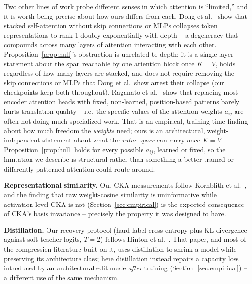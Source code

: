 \documentclass[11pt]{article}
\begin{document}
Two other lines of work probe different senses in which attention is ``limited,'' and
it is worth being precise about how ours differs from each. Dong et
al.~\cite{dong2021attention} show that stacked self-attention without skip connections
or MLPs collapses token representations to rank 1 doubly exponentially with depth -- a
degeneracy that compounds across many layers of attention interacting with each other.
Proposition~\ref{prop:hull}'s obstruction is unrelated to depth: it is a single-layer
statement about the span reachable by one attention block once $K=V$, holds regardless
of how many layers are stacked, and does not require removing the skip connections or
MLPs that Dong et al.\ show arrest their collapse (our checkpoints keep both
throughout). Raganato et al.~\cite{raganato2020fixed} show that replacing most encoder
attention heads with fixed, non-learned, position-based patterns barely hurts
translation quality -- i.e.\ the specific values of the attention weights $a_{ij}$ are
often not doing much specialized work. That is an empirical, training-time finding
about how much freedom the \emph{weights} need; ours is an architectural,
weight-independent statement about what the \emph{value space} can carry once $K=V$ --
Proposition~\ref{prop:hull} holds for every possible $a_{ij}$, learned or fixed, so the
limitation we describe is structural rather than something a better-trained or
differently-patterned attention could route around.

\textbf{Representational similarity.} Our CKA measurements follow Kornblith et
al.~\cite{kornblith2019similarity}, and the finding that raw weight-cosine similarity
is uninformative while activation-level CKA is not (Section~\ref{sec:empirical}) is
the expected consequence of CKA's basis invariance -- precisely the property it was
designed to have.

\textbf{Distillation.} Our recovery protocol (hard-label cross-entropy plus KL
divergence against soft teacher logits, $T=2$) follows Hinton et
al.~\cite{hinton2015distilling}. That paper, and most of the compression literature
built on it, uses distillation to shrink a model while preserving its architecture
class; here distillation instead repairs a capacity loss introduced by an
architectural edit made \emph{after} training (Section~\ref{sec:empirical}) -- a
different use of the same mechanism.
\end{document}
